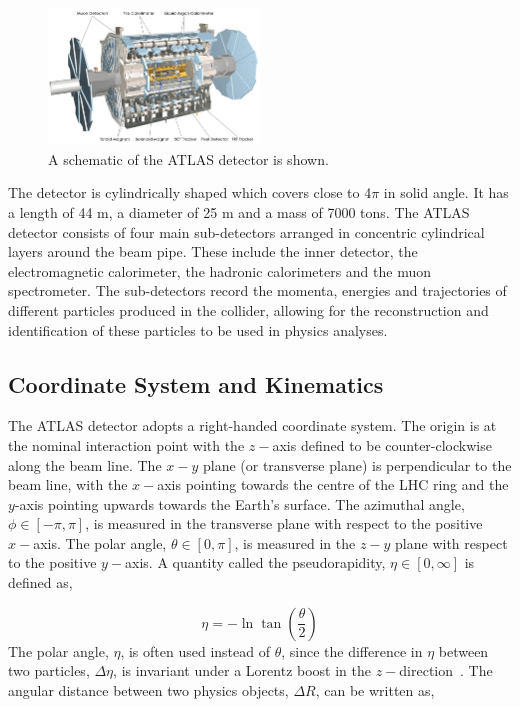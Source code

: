 \begin{figure}[h!]
 \includegraphics[width=0.5\textwidth]{figures/theoryFigs/atlasDetector.png}
 \centering
\caption{A schematic of the ATLAS detector is shown.~\cite{Collaboration_2008}}
\label{fig:atlas-detector}
\end{figure}

The detector is cylindrically shaped which covers close to 4$\pi$ in solid angle. It has a length of 44 m, a diameter of 25 m and a mass of 7000 tons. The ATLAS detector consists of four main sub-detectors arranged in concentric cylindrical layers around the beam pipe. These include the inner detector, the electromagnetic calorimeter, the hadronic calorimeters and the muon spectrometer. The sub-detectors record the momenta, energies and trajectories of different particles produced in the collider, allowing for the reconstruction and identification of these particles to be used in physics analyses.

\subsection{Coordinate System and Kinematics}

The ATLAS detector adopts a right-handed coordinate system. The origin is at the nominal interaction point with the $z-$axis defined to be counter-clockwise along the beam line. The $x-y$ plane (or transverse plane) is perpendicular to the beam line, with the $x-$axis pointing towards the centre of the LHC ring and the $y$-axis pointing upwards towards the Earth's surface. The azimuthal angle, $\phi \in [-\pi, \pi]$, is measured in the transverse plane with respect to the positive $x-$axis. The polar angle, $\theta \in [0,\pi]$, is measured in the $z-y$ plane with respect to the positive $y-$axis. A quantity called the pseudorapidity, $\eta \in [0,\infty]$ is defined as,

\begin{equation}
\eta = -\ln{\tan{\left(\frac{\theta}{2}\right)}}
\end{equation}
The polar angle, $\eta$, is often used instead of $\theta$, since the difference in $\eta$ between two particles, $\Delta \eta$, is invariant under a Lorentz boost in the $z-$direction~\cite{Tovey_2019}. The angular distance between two physics objects, $\Delta R$, can be written as,


